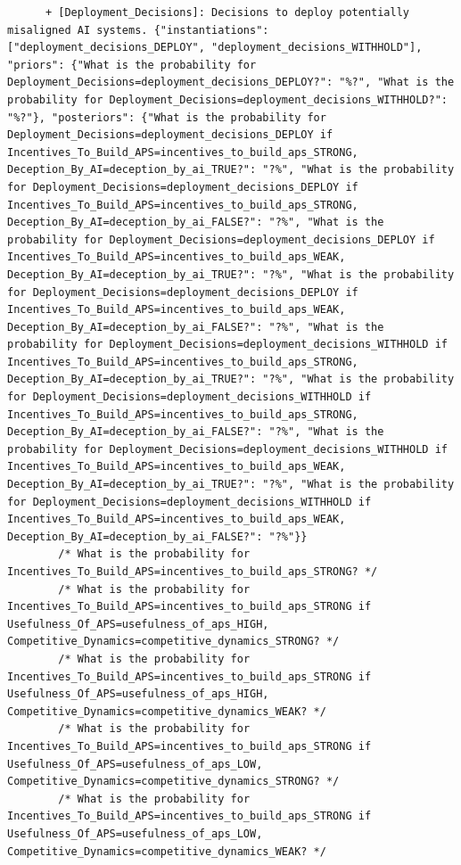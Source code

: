 \documentclass[
  11pt,
  letterpaper,
]{book}
\begin{document}
\begin{verbatim}
      + [Deployment_Decisions]: Decisions to deploy potentially misaligned AI systems. {"instantiations": ["deployment_decisions_DEPLOY", "deployment_decisions_WITHHOLD"], "priors": {"What is the probability for Deployment_Decisions=deployment_decisions_DEPLOY?": "%?", "What is the probability for Deployment_Decisions=deployment_decisions_WITHHOLD?": "%?"}, "posteriors": {"What is the probability for Deployment_Decisions=deployment_decisions_DEPLOY if Incentives_To_Build_APS=incentives_to_build_aps_STRONG, Deception_By_AI=deception_by_ai_TRUE?": "?%", "What is the probability for Deployment_Decisions=deployment_decisions_DEPLOY if Incentives_To_Build_APS=incentives_to_build_aps_STRONG, Deception_By_AI=deception_by_ai_FALSE?": "?%", "What is the probability for Deployment_Decisions=deployment_decisions_DEPLOY if Incentives_To_Build_APS=incentives_to_build_aps_WEAK, Deception_By_AI=deception_by_ai_TRUE?": "?%", "What is the probability for Deployment_Decisions=deployment_decisions_DEPLOY if Incentives_To_Build_APS=incentives_to_build_aps_WEAK, Deception_By_AI=deception_by_ai_FALSE?": "?%", "What is the probability for Deployment_Decisions=deployment_decisions_WITHHOLD if Incentives_To_Build_APS=incentives_to_build_aps_STRONG, Deception_By_AI=deception_by_ai_TRUE?": "?%", "What is the probability for Deployment_Decisions=deployment_decisions_WITHHOLD if Incentives_To_Build_APS=incentives_to_build_aps_STRONG, Deception_By_AI=deception_by_ai_FALSE?": "?%", "What is the probability for Deployment_Decisions=deployment_decisions_WITHHOLD if Incentives_To_Build_APS=incentives_to_build_aps_WEAK, Deception_By_AI=deception_by_ai_TRUE?": "?%", "What is the probability for Deployment_Decisions=deployment_decisions_WITHHOLD if Incentives_To_Build_APS=incentives_to_build_aps_WEAK, Deception_By_AI=deception_by_ai_FALSE?": "?%"}}
        /* What is the probability for Incentives_To_Build_APS=incentives_to_build_aps_STRONG? */
        /* What is the probability for Incentives_To_Build_APS=incentives_to_build_aps_STRONG if Usefulness_Of_APS=usefulness_of_aps_HIGH, Competitive_Dynamics=competitive_dynamics_STRONG? */
        /* What is the probability for Incentives_To_Build_APS=incentives_to_build_aps_STRONG if Usefulness_Of_APS=usefulness_of_aps_HIGH, Competitive_Dynamics=competitive_dynamics_WEAK? */
        /* What is the probability for Incentives_To_Build_APS=incentives_to_build_aps_STRONG if Usefulness_Of_APS=usefulness_of_aps_LOW, Competitive_Dynamics=competitive_dynamics_STRONG? */
        /* What is the probability for Incentives_To_Build_APS=incentives_to_build_aps_STRONG if Usefulness_Of_APS=usefulness_of_aps_LOW, Competitive_Dynamics=competitive_dynamics_WEAK? */

\end{verbatim}
\end{document}
